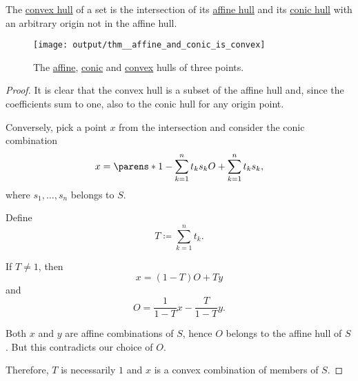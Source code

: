 \begin{proposition}\label{thm:affine_and_conic_is_convex}
  The \hyperref[def:convex_hull]{convex hull} of a set is the intersection of its \hyperref[def:affine_hull]{affine hull} and its \hyperref[def:conic_hull]{conic hull} with an arbitrary origin not in the affine hull.

  \begin{figure}[!ht]
    \centering
    \texttt{[image: output/thm\_\_affine\_and\_conic\_is\_convex]}
    \caption{The \hyperref[def:affine_hull]{affine}, \hyperref[def:conic_hull]{conic} and \hyperref[def:convex_hull]{convex} hulls of three points.}\label{fig:thm:affine_and_conic_is_convex}
  \end{figure}
\end{proposition}
\begin{proof}
  It is clear that the convex hull is a subset of the affine hull and, since the coefficients sum to one, also to the conic hull for any origin point.

  Conversely, pick a point \( x \) from the intersection and consider the conic combination
  \begin{equation*}
    x = \parens*{ 1 - \sum_{k=1}^n t_k s_k } O + \sum_{k=1}^n t_k s_k,
  \end{equation*}
  where \( s_1, \ldots, s_n \) belongs to \( S \).

  Define
  \begin{equation*}
    T \coloneqq \sum_{k=1}^n t_k.
  \end{equation*}

  If \( T \neq 1 \), then
  \begin{equation*}
    x = (1 - T) O + T y
  \end{equation*}
  and
  \begin{equation*}
    O = \frac 1 {1 - T} x - \frac T {1 - T} y.
  \end{equation*}

  Both \( x \) and \( y \) are affine combinations of \( S \), hence \( O \) belongs to the affine hull of \( S \). But this contradicts our choice of \( O \).

  Therefore, \( T \) is necessarily \( 1 \) and \( x \) is a convex combination of members of \( S \).
\end{proof}

